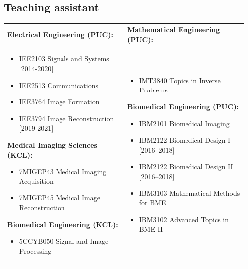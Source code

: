 \documentclass[12pt,american]{moderncv}
\providecommand{\tabularnewline}{\\}
\begin{document}


\subsection{Teaching assistant}

\hspace{3cm}%
\noindent\begin{minipage}[t]{\dimexpr\linewidth-3cm\relax}%
\begin{tabular}{@{}>{\raggedright}p{0.48\linewidth}>{\raggedright}p{0.48\linewidth}@{}}
\textbf{Electrical Engineering (PUC):} & \textbf{Mathematical Engineering (PUC):}\tabularnewline
\begin{itemize}
\item {\scriptsize IEE2103} Signals and Systems {\footnotesize{[}2014-2020{]}}{\footnotesize\par}
\item {\scriptsize IEE2513} Communications
\item {\scriptsize IEE3764} Image Formation
\item {\scriptsize IEE3794} Image{\footnotesize{} }Reconstruction{\footnotesize{}
{[}2019-2021{]}}{\footnotesize\par}
\end{itemize}
\textbf{Medical Imaging Sciences (KCL):}
\begin{itemize}
\item {\scriptsize 7MIGEP43} Medical Imaging Acquisition
\item {\scriptsize 7MIGEP45} Medical Image Reconstruction
\end{itemize}
\textbf{Biomedical Engineering (KCL):}
\begin{itemize}
\item {\scriptsize 5CCYB050} Signal and Image Processing
\end{itemize}
 & \begin{itemize}
\item {\scriptsize IMT3840} Topics in Inverse Problems
\end{itemize}
\textbf{Biomedical Engineering (PUC):}
\begin{itemize}
\item {\scriptsize IBM2101} Biomedical Imaging
\item {\scriptsize IBM2122} Biomedical Design I {\footnotesize{[}2016}--{\footnotesize 2018{]}}{\footnotesize\par}
\item {\scriptsize IBM2122} Biomedical Design II{\footnotesize{} {[}2016}--{\footnotesize 2018{]}}{\footnotesize\par}
\item {\scriptsize IBM3103} Mathematical Methods for BME
\item {\scriptsize IBM3102} Advanced Topics in BME II
\end{itemize}
\tabularnewline
\end{tabular}%
\end{minipage}
\end{document}

